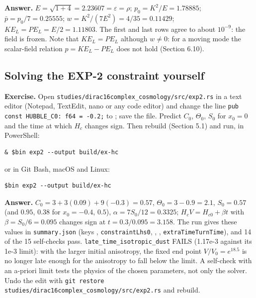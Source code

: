 \documentclass[11pt]{article}
\begin{document}
\textbf{Answer.} $E=\sqrt{1+4}=2.23607=\varepsilon=\rho$; $p_0=K^2/E=1.78885$; $\bar p=p_0/7=0.25555$; $w=K^2/(7E^2)=4/35=0.11429$; $KE_L=PE_L=E/2=1.11803$. The first and last rows agree to about $10^{-9}$: the field is frozen. Note that $KE_L=PE_L$ although $w\ne0$: for a moving mode the scalar-field relation $p=KE_L-PE_L$ does not hold (Section 6.10).

\subsection{Solving the EXP-2 constraint yourself}

\textbf{Exercise.} Open \texttt{studies/\allowbreak{}dirac16c\allowbreak{}omplex\_c\allowbreak{}osmology\allowbreak{}/src/exp\allowbreak{}2.rs} in a text editor (Notepad, TextEdit, nano or any code editor) and change the line \texttt{pub cons\allowbreak{}t HUBBLE\allowbreak{}\_C0: f64\allowbreak{} = -0.2;} to \texttt{}; save the file. Predict $C_0$, $\Theta_0$, $S_0$ for $x_0=0$ and the time at which $H_c$ changes sign. Then rebuild (Section 5.1) and run, in PowerShell:

\begin{Verbatim}[fontsize=\small]
& $bin exp2 --output build/ex-hc
\end{Verbatim}

or in Git Bash, macOS and Linux:

\begin{Verbatim}[fontsize=\small]
$bin exp2 --output build/ex-hc
\end{Verbatim}

\textbf{Answer.} $C_0=3+3(0.09)+9(-0.3)=0.57$, $\Theta_0=3-0.9=2.1$, $S_0=0.57$ (and $0.95$, $0.38$ for $x_0=-0.4$, $0.5$), $\alpha=7S_0/12=0.3325$; $H_cV=H_{c0}+\beta t$ with $\beta=S_0/6=0.095$ changes sign at $t=0.3/0.095=3.158$. The run gives these values in \texttt{summary.\allowbreak{}json} (keys \texttt{}, \texttt{constrai\allowbreak{}ntLhs0}, \texttt{}, \texttt{}, \texttt{extraTim\allowbreak{}eTurnTim\allowbreak{}e}), and 14 of the 15 self-checks pass. \texttt{late\_tim\allowbreak{}e\_isotro\allowbreak{}pic\_dust} FAILS (1.17e-3 against its 1e-3 limit): with the larger initial anisotropy, the fixed end point $V/V_0=e^{18.5}$ is no longer late enough for the anisotropy to fall below the limit. A self-check with an a-priori limit tests the physics of the chosen parameters, not only the solver. Undo the edit with \texttt{git rest\allowbreak{}ore stud\allowbreak{}ies/dira\allowbreak{}c16compl\allowbreak{}ex\_cosmo\allowbreak{}logy/src\allowbreak{}/exp2.rs} and rebuild.
\end{document}
